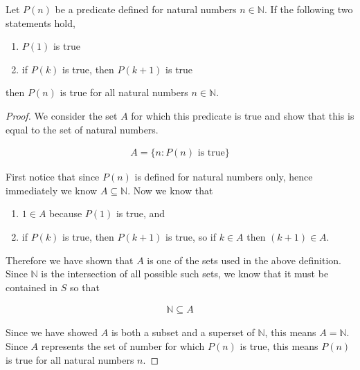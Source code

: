 \documentclass[twoside]{report}
\begin{document}
\vspace{\baselineskip}
\begin{theorem}
	Let $P(n)$ be a predicate defined for natural numbers $n \in \mathbb{N}$. If the following two statements hold,
	
	\vspace{\baselineskip}
	\begin{enumerate}
		\item $P(1)$ is true
		\item if $P(k)$ is true, then $P(k + 1)$ is true
	\end{enumerate}
	\vspace{\baselineskip}

	then $P(n)$ is true for all natural numbers $n \in \mathbb{N}$.
\end{theorem}
\begin{proof}
	We consider the set $A$ for which this predicate is true and show that this is equal to the set of natural numbers.
	
	\begin{align*}
		A = \{ n : P(n) \text{ is true} \}
	\end{align*}
	
	First notice that since $P(n)$ is defined for natural numbers only, hence immediately we know $A \subseteq \mathbb{N}$. Now we know that
	
	\vspace{\baselineskip}
	\begin{enumerate}
		\item $1 \in A$ because $P(1)$ is true, and
		\item if $P(k)$ is true, then $P(k + 1)$ is true, so if $k \in A$ then $(k + 1) \in A$.
	\end{enumerate}
	\vspace{\baselineskip}

	Therefore we have shown that $A$ is one of the sets used in the above definition. Since $\mathbb{N}$ is the intersection of all possible such sets, we know that it must be contained in $S$ so that
	
	\begin{align*}
		\mathbb{N} \subseteq A
	\end{align*}
	
	Since we have showed $A$ is both a subset and a superset of $\mathbb{N}$, this means $A = \mathbb{N}$. Since $A$ represents the set of number for which $P(n)$ is true, this means $P(n)$ is true for all natural numbers $n$.
\end{proof}
\vspace{\baselineskip}
\end{document}
